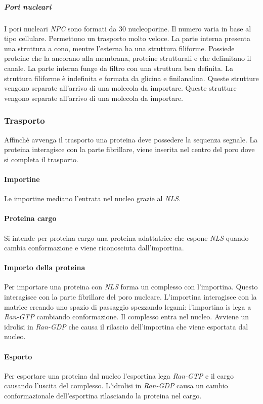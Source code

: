 				\subparagraph{Pori nucleari}
				I pori nucleari \emph{NPC} sono formati da $30$ nucleoporine.
				Il numero varia in base al tipo cellulare.
				Permettono un trasporto molto veloce.
				La parte interna presenta una struttura a cono, mentre l'esterna ha una struttura filiforme.
				Possiede proteine che la ancorano alla membrana, proteine strutturali e che delimitano il canale.
				La parte interna funge da filtro con una struttura ben definita.
				La struttura filiforme \`e indefinita e formata da glicina e finilanalina.
				Queste strutture vengono separate all'arrivo di una molecola da importare.
				Queste strutture vengono separate all'arrivo di una molecola da importare.
		
		\subsubsection{Trasporto}
		Affinch\`e avvenga il trasporto una proteina deve possedere la sequenza segnale.
		La proteina interagisce con la parte fibrillare, viene inserita nel centro del poro dove si completa il trasporto.

			\paragraph{Importine}
			Le importine mediano l'entrata nel nucleo grazie al \emph{NLS}.

			\paragraph{Proteina cargo}
			Si intende per proteina cargo una proteina adattatrice che espone \emph{NLS} quando cambia conformazione e viene riconosciuta dall'importina.

			\paragraph{Importo della proteina}
			Per importare una proteina con \emph{NLS} forma un complesso con l'importina.
			Questo interagisce con la parte fibrillare del poro nucleare.
			L'importina interagisce con la matrice creando uno spazio di passaggio spezzando legami: l'importina is lega a \emph{Ran-GTP} cambiando conformazione.
			Il complesso entra nel nucleo.
			Avviene un idrolisi in \emph{Ran-GDP} che causa il rilascio dell'importina che viene esportata dal nucleo.

			\paragraph{Esporto}
			Per esportare una proteina dal nucleo l'esportina lega \emph{Ran-GTP} e il cargo causando l'uscita del complesso.
			L'idrolisi in \emph{Ran-GDP} causa un cambio conformazionale dell'esportina rilasciando la proteina nel cargo.

